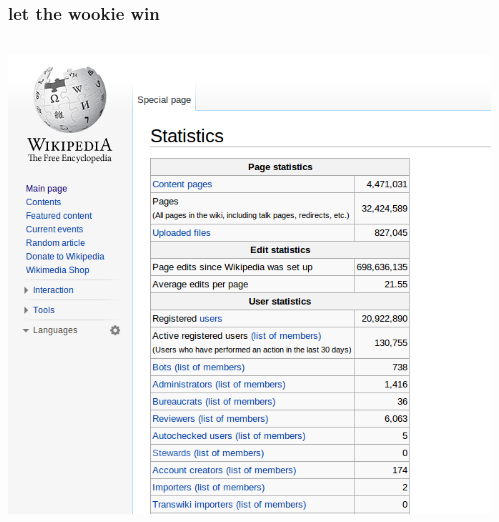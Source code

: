 \documentclass{beamer}
\begin{document}
\begin{frame}
  \frametitle{let the wookie win}
  \begin{columns}
    \begin{column}{0.5\textwidth}
      \includegraphics[height = 0.8\textheight, width = \textwidth, keepaspectratio = true]{figure/wiki_stats}
    \end{column}
    \begin{column}{0.5\textwidth}

\end{column}
\end{columns}
\end{frame}
\end{document}
